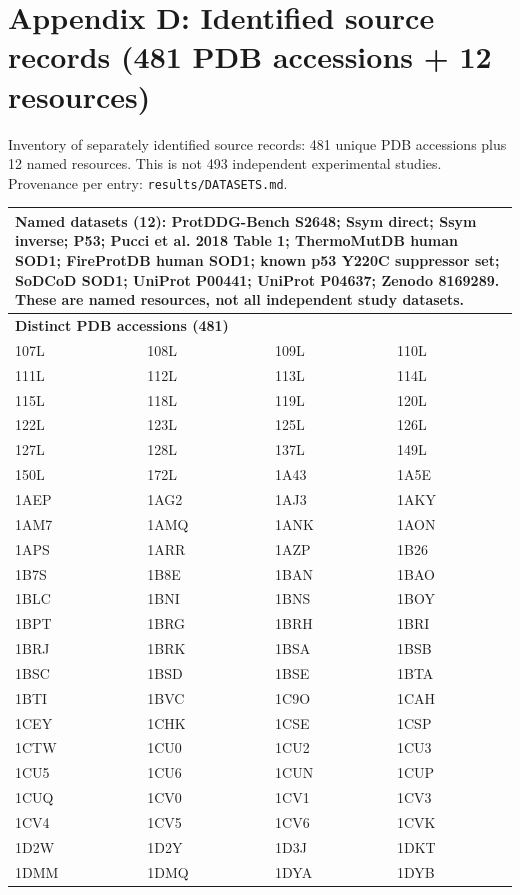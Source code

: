 \section*{Appendix D: Identified source records (481 PDB accessions + 12 resources)}
Inventory of separately identified source records: 481 unique PDB accessions plus 12 named resources. This is not 493 independent experimental studies. Provenance per entry: \texttt{results/DATASETS.md}.
\begin{longtable}{p{} p{} p{} p{}}
\hline
\endhead
\multicolumn{4}{p{0.88\textwidth}}{\textbf{Named datasets (12):} ProtDDG-Bench S2648; Ssym direct; Ssym inverse; P53; Pucci et al. 2018 Table 1; ThermoMutDB human SOD1; FireProtDB human SOD1; known p53 Y220C suppressor set; SoDCoD SOD1; UniProt P00441; UniProt P04637; Zenodo 8169289. These are named resources, not all independent study datasets.} \\
\hline
\multicolumn{4}{l}{\textbf{Distinct PDB accessions (481)}} \\
107L & 108L & 109L & 110L \\
111L & 112L & 113L & 114L \\
115L & 118L & 119L & 120L \\
122L & 123L & 125L & 126L \\
127L & 128L & 137L & 149L \\
150L & 172L & 1A43 & 1A5E \\
1AEP & 1AG2 & 1AJ3 & 1AKY \\
1AM7 & 1AMQ & 1ANK & 1AON \\
1APS & 1ARR & 1AZP & 1B26 \\
1B7S & 1B8E & 1BAN & 1BAO \\
1BLC & 1BNI & 1BNS & 1BOY \\
1BPT & 1BRG & 1BRH & 1BRI \\
1BRJ & 1BRK & 1BSA & 1BSB \\
1BSC & 1BSD & 1BSE & 1BTA \\
1BTI & 1BVC & 1C9O & 1CAH \\
1CEY & 1CHK & 1CSE & 1CSP \\
1CTW & 1CU0 & 1CU2 & 1CU3 \\
1CU5 & 1CU6 & 1CUN & 1CUP \\
1CUQ & 1CV0 & 1CV1 & 1CV3 \\
1CV4 & 1CV5 & 1CV6 & 1CVK \\
1D2W & 1D2Y & 1D3J & 1DKT \\
1DMM & 1DMQ & 1DYA & 1DYB \\

\end{longtable}
